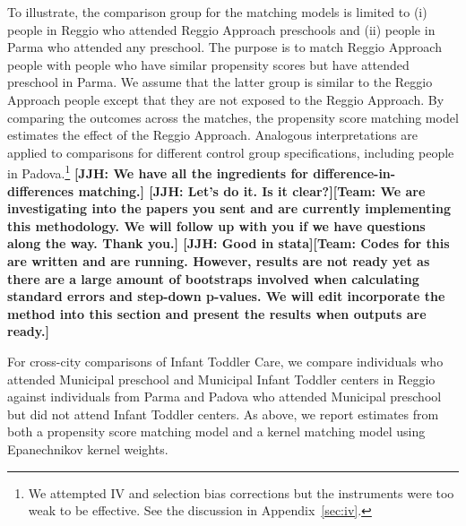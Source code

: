 To illustrate, the comparison group for the matching models is limited to (i) people in Reggio who attended Reggio Approach preschools and (ii) people in Parma who attended any preschool. The purpose is to match Reggio Approach people with people who have similar propensity scores but have attended preschool in Parma. We assume that the latter group is similar to the Reggio Approach people except that they are not exposed to the Reggio Approach. By comparing the outcomes across the matches, the propensity score matching model estimates the effect of the Reggio Approach. Analogous interpretations are applied to comparisons for different control group specifications, including people in Padova.\footnote{We attempted IV and selection bias corrections but the instruments were too weak to be effective. See the discussion in Appendix~\ref{sec:iv}.} \textbf{[JJH: We have all the ingredients for difference-in-differences matching.] [JJH: Let's do it. Is it clear?][Team: We are investigating into the papers you sent and are currently implementing this methodology. We will follow up with you if we have questions along the way. Thank you.] [JJH: Good in stata][Team: Codes for this are written and are running. However, results are not ready yet as there are a large amount of bootstraps involved when calculating standard errors and step-down p-values. We will edit incorporate the method into this section and present the results when outputs are ready.]}

For cross-city comparisons of Infant Toddler Care, we compare individuals who attended Municipal preschool and Municipal Infant Toddler centers in Reggio against individuals from Parma and Padova who attended Municipal preschool but did not attend Infant Toddler centers. As above, we report estimates from both a propensity score matching model and a kernel matching model using Epanechnikov kernel weights. 
